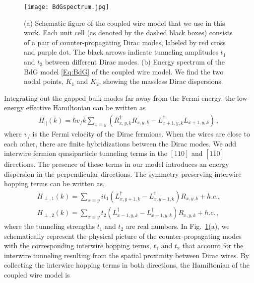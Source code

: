 \begin{figure}[htbp]
	\centering\texttt{[image: BdGspectrum.jpg]}
	\caption[Schematic figure of the coupled wire model and the energy spectrum of the BdG model.]{(a) Schematic figure of the coupled wire model that we use in this work. Each unit cell (as denoted by the dashed black boxes) consists of a pair of counter-propagating Dirac modes, labeled by red cross and purple dot. The black arrows indicate tunneling amplitudes $t_1$ and $t_2$ between different Dirac modes. (b) Energy spectrum of the BdG model \eqref{Eq:BdG} of the coupled wire model. We find the two nodal points, $K_1$ and $K_2$, showing the massless Dirac dispersions.}\label{fig:3Darray}
\end{figure}


Integrating out the gapped bulk modes far away from the Fermi energy, the low-energy effective Hamiltonian can be written as \begin{gather}H_{||}(k)=\hbar v_fk\sum_{x\equiv y}\left(R_{x,y,k}^\dagger R_{x,y,k}-L_{x+1,y,k}^\dagger L_{x+1,y,k}\right) \,, \label{Hparallel}\end{gather} where $v_f$ is the Fermi velocity of the Dirac fermions. When the wires are close to each other, there are finite hybridizations between the Dirac modes. We add interwire fermion quasiparticle tunneling terms in the $[110]$ and $[1\bar{1}0]$ directions. The presence of these terms in our model introduces an energy dispersion in the perpendicular directions. The symmetry-preserving interwire hopping terms can be written as,
\begin{gather}
H_{\perp,1}(k)=\sum_{x\equiv y}it_1\left(L^\dagger_{x,y+1,k}-L^\dagger_{x,y-1,k}\right)R_{x,y,k}+h.c.,
\\
H_{\perp,2}(k)=\sum_{x\equiv y}t_2\left(L^\dagger_{x-1,y,k}-L^\dagger_{x+1,y,k}\right)R_{x,y,k}+h.c. \,,
\end{gather}
where the tunneling strengths $t_1$ and $t_2$ are real numbers. In Fig.~\ref{fig:3Darray}(a), we schematically represent the physical picture of the counter-propagating modes with the corresponding interwire hopping terms, $t_1$ and $t_2$ that account for the interwire tunneling resulting from the spatial proximity between Dirac wires. By collecting the interwire hopping terms in both directions, the Hamiltonian of the coupled wire model is
